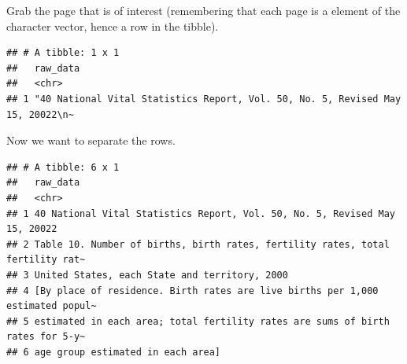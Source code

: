 \documentclass[
]{book}
\newenvironment{Shaded}{\begin{snugshade}}{\end{snugshade}}
\newcommand{\CharTok}[1]{\textcolor[rgb]{0.31,0.60,0.02}{#1}}
\newcommand{\DataTypeTok}[1]{\textcolor[rgb]{0.13,0.29,0.53}{#1}}
\newcommand{\DecValTok}[1]{\textcolor[rgb]{0.00,0.00,0.81}{#1}}
\newcommand{\KeywordTok}[1]{\textcolor[rgb]{0.13,0.29,0.53}{\textbf{#1}}}
\newcommand{\NormalTok}[1]{#1}
\newcommand{\OperatorTok}[1]{\textcolor[rgb]{0.81,0.36,0.00}{\textbf{#1}}}
\newcommand{\OtherTok}[1]{\textcolor[rgb]{0.56,0.35,0.01}{#1}}
\newcommand{\StringTok}[1]{\textcolor[rgb]{0.31,0.60,0.02}{#1}}
\begin{document}
Grab the page that is of interest (remembering that each page is a element of the character vector, hence a row in the tibble).

\begin{Shaded}
\end{Shaded}

\begin{verbatim}
## # A tibble: 1 x 1
##   raw_data                                                                      
##   <chr>                                                                         
## 1 "40 National Vital Statistics Report, Vol. 50, No. 5, Revised May 15, 20022\n~
\end{verbatim}

Now we want to separate the rows.

\begin{Shaded}
\end{Shaded}

\begin{verbatim}
## # A tibble: 6 x 1
##   raw_data                                                                      
##   <chr>                                                                         
## 1 40 National Vital Statistics Report, Vol. 50, No. 5, Revised May 15, 20022    
## 2 Table 10. Number of births, birth rates, fertility rates, total fertility rat~
## 3 United States, each State and territory, 2000                                 
## 4 [By place of residence. Birth rates are live births per 1,000 estimated popul~
## 5 estimated in each area; total fertility rates are sums of birth rates for 5-y~
## 6 age group estimated in each area]
\end{verbatim}
\end{document}
